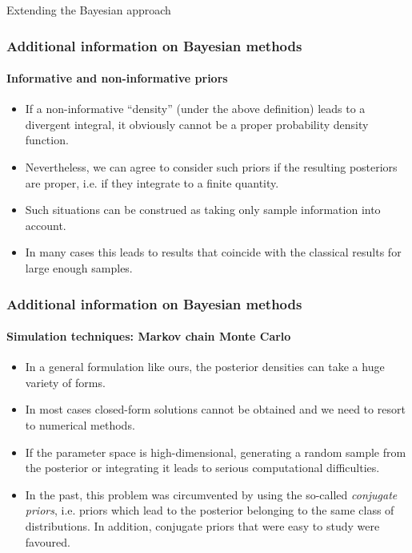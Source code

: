 \documentclass[10pt]{beamer}
\theoremstyle{definition}
\begin{document}
\begin{section}{Extending the Bayesian approach}
\begin{frame}[fragile]
\frametitle{Additional information on Bayesian methods}
\framesubtitle{Informative and non-informative priors}
\begin{itemize}\itemsep1em
\item If a non-informative ``density'' (under the above definition) leads to a divergent integral, it obviously cannot be a proper probability density function.
\item Nevertheless, we can agree to consider such priors if the resulting posteriors are proper, i.e. if they integrate to a finite quantity.
\item Such situations can be construed as taking only sample information into account.
\item In many cases this leads to results that coincide with the classical results for large enough samples. 
\end{itemize}
\end{frame}

\begin{frame}[fragile]
\frametitle{Additional information on Bayesian methods}
\framesubtitle{Simulation techniques: Markov chain Monte Carlo}
\begin{itemize}\itemsep1em
\item In a general formulation like ours, the posterior densities can take a huge variety of forms.
\item In most cases closed-form solutions cannot be obtained and we need to resort to numerical methods.
\item If the parameter space is high-dimensional, generating a random sample from the posterior or integrating it leads to serious computational difficulties.
\item In the past, this problem was circumvented by using the so-called \emph{conjugate priors}, i.e. priors which lead to the posterior belonging to the same class of distributions. In addition, conjugate priors that were easy to study were favoured.
\end{itemize}
\end{frame}


\end{section}
\end{document}
